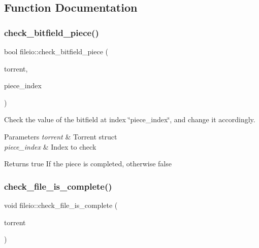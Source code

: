 \subsection{Function Documentation}
\mbox{\label{namespacefileio_ae56e407c834f29cd78eb144cb754a8f5}} 
\subsubsection{\texorpdfstring{check\+\_\+bitfield\+\_\+piece()}{check\_bitfield\_piece()}}
{\footnotesize\ttfamily bool fileio\+::check\+\_\+bitfield\+\_\+piece (\begin{DoxyParamCaption}\item[{\hyperlink{structtorr_1_1Torrent}{Torrent} \&}]{torrent,  }\item[{size\+\_\+t}]{piece\+\_\+index }\end{DoxyParamCaption})}



Check the value of the bitfield at index \char`\"{}piece\+\_\+index\char`\"{}, and change it accordingly. 


\begin{DoxyParams}{Parameters}
{\em torrent} & Torrent struct \\
\hline
{\em piece\+\_\+index} & Index to check \\
\hline
\end{DoxyParams}
\begin{DoxyReturn}{Returns}
true If the piece is completed, otherwise false 
\end{DoxyReturn}
\mbox{\label{namespacefileio_ae9adface3fdec7387d6d5cf00ff1d4d1}} 
\subsubsection{\texorpdfstring{check\+\_\+file\+\_\+is\+\_\+complete()}{check\_file\_is\_complete()}}
{\footnotesize\ttfamily void fileio\+::check\+\_\+file\+\_\+is\+\_\+complete (\begin{DoxyParamCaption}\item[{\hyperlink{structtorr_1_1Torrent}{Torrent} \&}]{torrent }\end{DoxyParamCaption})}



